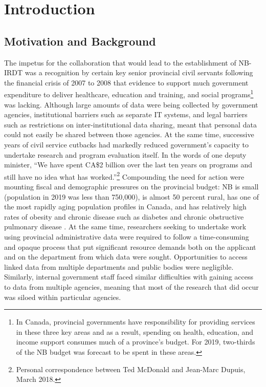 \hypertarget{nbirdt-intro}{%
\section{Introduction}\label{nbirdt-intro}}

\hypertarget{nbirdt-motivation}{%
\subsection{Motivation and Background}\label{nbirdt-motivation}}

The impetus for the collaboration that would lead to the establishment of NB-IRDT was a recognition by certain key senior provincial civil servants following the financial crisis of 2007 to 2008 that evidence to support much government expenditure to deliver healthcare, education and training, and social programs\footnote{In Canada, provincial governments have responsibility for providing services in these three key areas and as a result, spending on health, education, and income support consumes much of a province's budget. For 2019, two-thirds of the NB budget was forecast to be spent in these areas.} was lacking. Although large amounts of data were being collected by government agencies, institutional barriers such as separate IT systems, and legal barriers such as restrictions on inter-institutional data sharing, meant that personal data could not easily be shared between those agencies. At the same time, successive years of civil service cutbacks had markedly reduced government's capacity to undertake research and program evaluation itself. In the words of one deputy minister, ``We have spent CA\$2 billion over the last ten years on programs and still have no idea what has worked.''\footnote{Personal correspondence between Ted McDonald and Jean-Marc Dupuis, March 2018.} Compounding the need for action were mounting fiscal and demographic pressures on the provincial budget: NB is small (population in 2019 was less than 750,000), is almost 50 percent rural, has one of the most rapidly aging population profiles in Canada, and has relatively high rates of obesity and chronic disease such as diabetes and chronic obstructive pulmonary disease \citep{statisticscanada2020}. At the same time, researchers seeking to undertake work using provincial administrative data were required to follow a time-consuming and opaque process that put significant resource demands both on the applicant and on the department from which data were sought. Opportunities to access linked data from multiple departments and public bodies were negligible. Similarly, internal government staff faced similar difficulties with gaining access to data from multiple agencies, meaning that most of the research that did occur was siloed within particular agencies.

